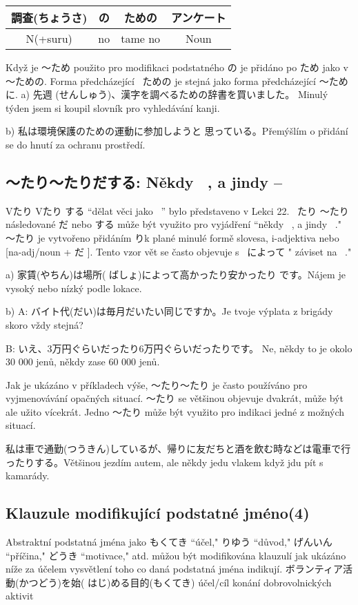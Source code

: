 \begin{center}
\begin{tabular}{|c|c|c|c|}
\hline
調查(ちょうさ)&の&ための& アンケート\\
\hline
N(+suru)&no&tame no&Noun\\
\hline
\end{tabular}
\end{center}
Když je 〜ため použito pro modifikaci podstatného の je přidáno po ため jako v 〜ための.  Forma předcházející  ~ための je stejná jako forma předcházející  〜ために. 
a) 先週 (せんしゅう)、漢字を調べるための辞書を買いました。 Minulý týden jsem si koupil slovník pro vyhledávání kanji.


b) 私は環境保護のための運動に参加しようと 思っている。Přemýšlím o přidání se do hnutí za ochranu prostředí.


\subsection{ 〜たり〜たりだする: Někdy ~, a jindy --}

Vたり Vたり する “dělat věci jako ~” bylo představeno v Lekci 22. ~たり 〜たり následované  だ nebo する může být využito pro vyjádření “někdy ~, a jindy ~." 〜たり je vytvořeno přidáním りk plané minulé formě slovesa, i-adjektiva nebo  [na-adj/noun + だ ]. Tento vzor vět se často objevuje s ~によって " záviset na ~." 

a) 家賃(やちん)は場所( ばしょ)によって高かったり安かったり です。Nájem je vysoký nebo nízký podle lokace.

b) A: バイト代(だい)は毎月だいたい同じですか。Je tvoje výplata z brigády skoro vždy stejná?


B: いえ、3万円ぐらいだったり6万円ぐらいだったりです。 Ne, někdy to je okolo 30 000 jenů, někdy zase 60 000 jenů.

Jak je ukázáno v příkladech výše, 〜たり〜たり je často používáno pro vyjmenovávání opačných situací. 〜たり se většinou objevuje dvakrát, může být ale užito vícekrát. Jedno 〜たり může být využito pro indikaci jedné z možných situací.


私は車で通勤(つうきん)しているが、帰りに友だちと酒を飲む時などは電車で行ったりする。Většinou jezdím autem, ale někdy jedu vlakem když jdu pít s kamarády.





\subsection{ Klauzule modifikující podstatné jméno(4)}
Abstraktní podstatná jména jako  もくてき “účel," りゆう “důvod," げんいん “příčina," どうき
“motivace," atd. můžou být modifikována klauzulí jak ukázáno níže za účelem vysvětlení toho co daná podstatná jména indikují.
ボランティア活動(かつどう)を始( はじ)める目的(もくてき) účel/cíl konání dobrovolnických aktivit



